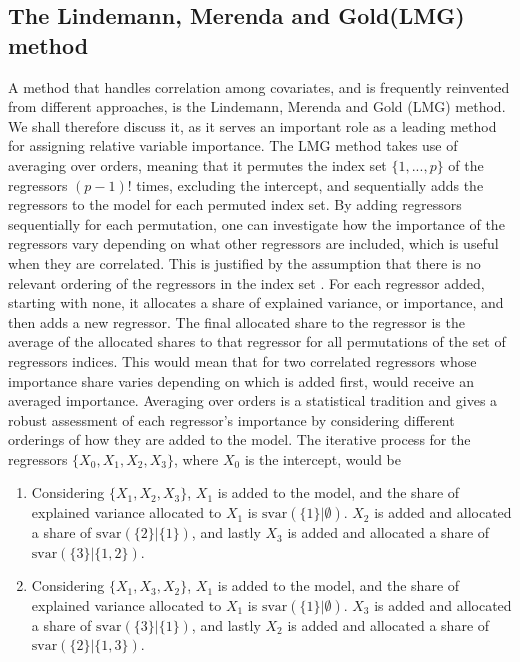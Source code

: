 \subsection{The Lindemann, Merenda and Gold(LMG) method}
\label{sec:lmg}
A method that handles correlation among covariates, and is frequently reinvented \citep{gromping_relaimpo} from different approaches, is the Lindemann, Merenda and Gold (LMG) method.
We shall therefore discuss it, as it serves an important role as a leading method for assigning relative variable importance.  
The LMG method takes use of averaging over orders, meaning that it permutes the index set $\{1, ..., p\}$  of the regressors $(p-1)!$ times, excluding the intercept, and sequentially adds the regressors to the model for each permuted index set.
By adding regressors sequentially for each permutation, one can investigate how the importance of the regressors vary depending on what other regressors are included, which is useful when they are correlated.
This is justified by the assumption that there is no relevant ordering of the regressors in the index set \citep{kruskal_lmg_1987}.
For each regressor added, starting with none, it allocates a share of explained variance, or importance, and then adds a new regressor.
The final allocated share to the regressor is the average of the allocated shares to that regressor for all permutations of the set of regressors indices. 
This would mean that for two correlated regressors whose importance share varies depending on which is added first, would receive an averaged importance.
Averaging over orders is a statistical tradition \citep{kruskal_lmg_1987} and gives a robust assessment of each regressor's importance by considering different orderings of how they are added to the model. 
The iterative process for the regressors $\{X_0, X_1, X_2, X_3\}$, where $X_0$ is the intercept, would be
\begin{enumerate}
    \item Considering $\{X_1, X_2, X_3\}$,  $X_1$ is added to the model, and the share of explained variance allocated to $X_1$ is $\text{svar}(\{1\} \lvert \emptyset)$. $X_2$ is added and allocated a share of $\text{svar}(\{2\} \lvert \{1\})$, and lastly $X_3$ is added and allocated a share of $\text{svar}(\{3\} \lvert \{1, 2\})$.
    \item Considering $\{X_1, X_3, X_2\}$,  $X_1$ is added to the model, and the share of explained variance allocated to $X_1$ is $\text{svar}(\{1\} \lvert \emptyset)$. $X_3$ is added and allocated a share of $\text{svar}(\{3\} \lvert \{1\})$, and lastly $X_2$ is added and allocated a share of $\text{svar}(\{2\} \lvert \{1, 3\})$.
\end{enumerate}
